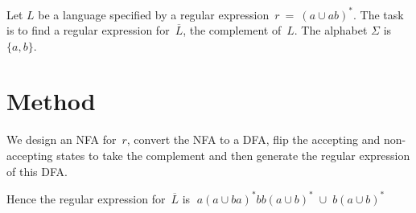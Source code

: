 \documentclass[12pt,letterpaper]{article}
\begin{document}
Let $L$ be a language specified by
a regular expression~$r ~ = ~ (a \cup ab)^*$. The task is to find a regular expression for~$\overline{L}$, the
complement of~$L$. The alphabet $\Sigma$ is~$\{ a, b \}$.

\section*{Method}
We design an NFA for~$r$, convert the NFA to a DFA, flip the accepting and
non-accepting states to take the complement and then generate the regular expression of this
DFA.





Hence the regular expression for~$\overline{L}$ is $\; a{(a \cup ba)}^* bb{(a\cup b)}^* \; \cup \; b(a \cup b )^*$
\end{document}
